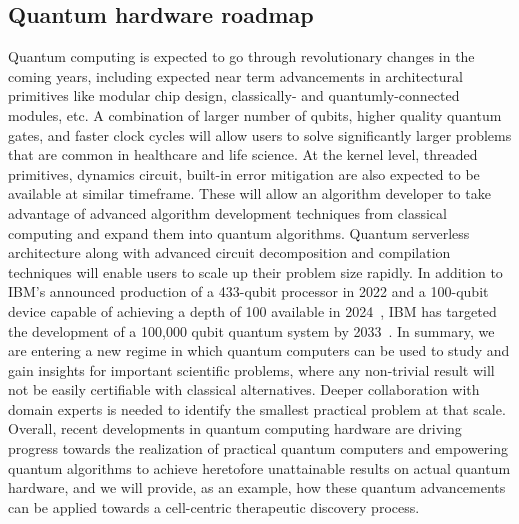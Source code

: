 \documentclass{article}
\begin{document}
\subsection{Quantum hardware roadmap}
Quantum computing is expected to go through revolutionary changes in the coming years, including expected near term advancements in architectural primitives like modular chip design, classically- and quantumly-connected modules, etc. A combination of larger number of qubits, higher quality quantum gates, and faster clock cycles will allow users to solve significantly larger problems that are common in healthcare and life science.  At the kernel level, threaded primitives, dynamics circuit, built-in error mitigation are also expected to be available at similar timeframe. These will allow an algorithm developer to take advantage of advanced algorithm development techniques from classical computing and expand them into quantum algorithms. Quantum serverless architecture along with advanced circuit decomposition and compilation techniques will enable users to scale up their problem size rapidly. In addition to IBM's announced production of a 433-qubit processor in 2022 and a 100-qubit device capable of achieving a depth of 100 available in 2024~\cite{IBMQuantumCentricSupercomputing}, IBM has targeted the development  of a 100,000 qubit quantum system by 2033~\cite{IBM100000}. In summary, we are entering a new regime in which quantum computers can be used to study and gain insights for important scientific problems, where any non-trivial result will not be easily certifiable with classical alternatives. Deeper collaboration with domain experts is needed to identify the smallest practical problem at that scale. 
Overall, recent developments in quantum computing hardware are driving progress towards the realization of practical quantum computers and empowering quantum algorithms to achieve heretofore unattainable results on actual quantum hardware, and we will provide, as an example, how these quantum advancements can be applied towards a cell-centric therapeutic discovery process.
\\
\end{document}
